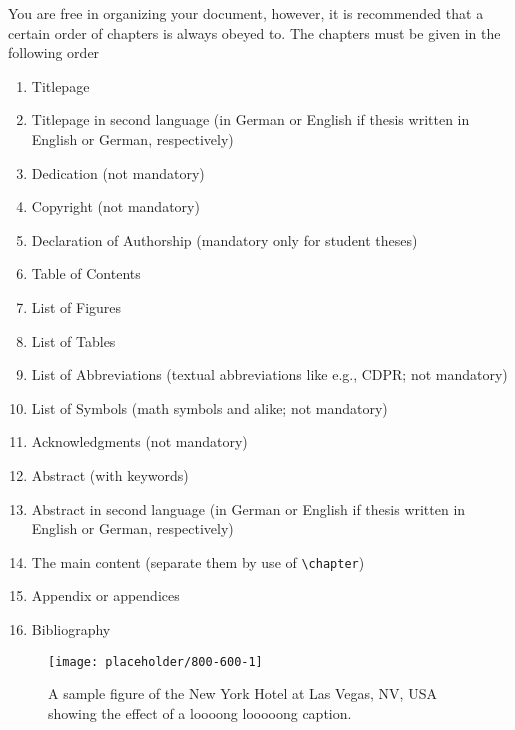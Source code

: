 You are free in organizing your document, however, it is recommended that a certain order of chapters is always obeyed to. The chapters must be given in the following order

\begin{enumerate}
    \item Titlepage
    \item Titlepage in second language (in German or English if thesis written in English or German, respectively)
    \item Dedication (not mandatory)
    \item Copyright (not mandatory)
    \item Declaration of Authorship (mandatory only for student theses)
    \item Table of Contents
    \item List of Figures
    \item List of Tables
    \item List of Abbreviations (textual abbreviations like e.g., CDPR; not mandatory)
    \item List of Symbols (math symbols and alike; not mandatory)
    \item Acknowledgments (not mandatory)
    \item Abstract (with keywords)
    \item Abstract in second language (in German or English if thesis written in English or German, respectively)
    \item The main content (separate them by use of \lstinline!\chapter!)
    \item Appendix or appendices
    \item Bibliography
\end{enumerate}

\begin{figure}
    \centering
    \texttt{[image: placeholder/800-600-1]}
    \caption{A sample figure of the New York Hotel at Las Vegas, NV, USA showing the effect of a loooong looooong caption.}
    \label{fig:sample-figure}
\end{figure}

